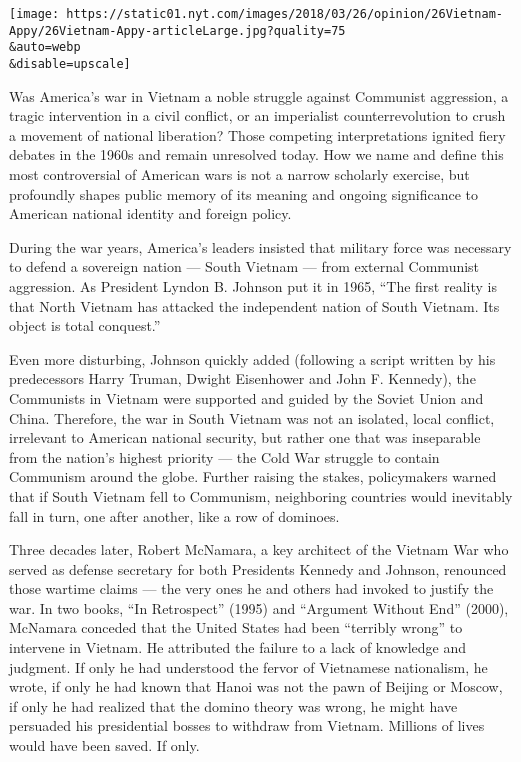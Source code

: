 \texttt{[image: https://static01.nyt.com/images/2018/03/26/opinion/26Vietnam-Appy/26Vietnam-Appy-articleLarge.jpg?quality=75\\\&auto=webp\\\&disable=upscale]}

Was America's war in Vietnam a noble struggle against Communist
aggression, a tragic intervention in a civil conflict, or an imperialist
counterrevolution to crush a movement of national liberation? Those
competing interpretations ignited fiery debates in the 1960s and remain
unresolved today. How we name and define this most controversial of
American wars is not a narrow scholarly exercise, but profoundly shapes
public memory of its meaning and ongoing significance to American
national identity and foreign policy.

During the war years, America's leaders insisted that military force was
necessary to defend a sovereign nation --- South Vietnam --- from
external Communist aggression. As President Lyndon B. Johnson put it in
1965, ``The first reality is that North Vietnam has attacked the
independent nation of South Vietnam. Its object is total conquest.''

Even more disturbing, Johnson quickly added (following a script written
by his predecessors Harry Truman, Dwight Eisenhower and John F.
Kennedy), the Communists in Vietnam were supported and guided by the
Soviet Union and China. Therefore, the war in South Vietnam was not an
isolated, local conflict, irrelevant to American national security, but
rather one that was inseparable from the nation's highest priority ---
the Cold War struggle to contain Communism around the globe. Further
raising the stakes, policymakers warned that if South Vietnam fell to
Communism, neighboring countries would inevitably fall in turn, one
after another, like a row of dominoes.

Three decades later, Robert McNamara, a key architect of the Vietnam War
who served as defense secretary for both Presidents Kennedy and Johnson,
renounced those wartime claims --- the very ones he and others had
invoked to justify the war. In two books, ``In Retrospect'' (1995) and
``Argument Without End'' (2000), McNamara conceded that the United
States had been ``terribly wrong'' to intervene in Vietnam. He
attributed the failure to a lack of knowledge and judgment. If only he
had understood the fervor of Vietnamese nationalism, he wrote, if only
he had known that Hanoi was not the pawn of Beijing or Moscow, if only
he had realized that the domino theory was wrong, he might have
persuaded his presidential bosses to withdraw from Vietnam. Millions of
lives would have been saved. If only.

